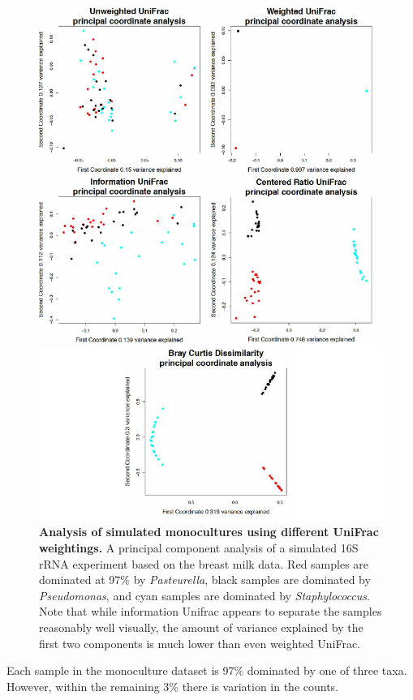 \documentclass[10pt,letterpaper]{article}
\begin{document}
\begin{figure}[h]
\includegraphics[scale=0.8]{monoculture.eps}
\caption{{\bf Analysis of simulated monocultures using different UniFrac weightings. }
A principal component analysis of a simulated 16S rRNA experiment based on the breast milk data. Red samples are dominated at 97\% by \textit{Pasteurella}, black samples are dominated by \textit{Pseudomonas}, and cyan samples are dominated by \textit{Staphylococcus}. Note that while information Unifrac appears to separate the samples reasonably well visually, the amount of variance explained by the first two components is much lower than even weighted UniFrac.}
\label{fig8}
\end{figure}

Each sample in the monoculture dataset is 97\% dominated by one of three taxa. However, within the remaining 3\% there is variation in the counts.
\end{document}
